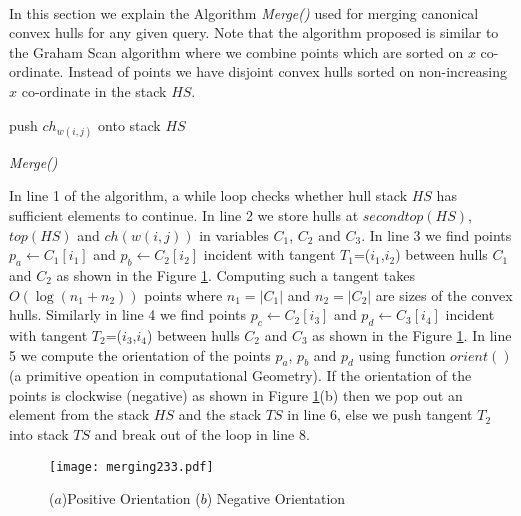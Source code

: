 \documentclass[runningheads,a4paper]{llncs}
\begin{document}
\paragraph{}
In this section we explain the Algorithm \emph{Merge()} used for merging canonical
convex hulls for any given query.  Note that the algorithm proposed is similar
to the Graham Scan algorithm \cite{graham} where we combine points which are
sorted on $x$ co-ordinate.
Instead of points we have disjoint convex hulls sorted on non-increasing $x$ co-ordinate in the stack $HS$.
\begin{algorithm}\label{merging}
push $ch_{w(i,j)}$ onto stack $HS$\;
\caption{\em Merge()}
\end{algorithm}
In line 1 of the algorithm, a while loop checks whether hull stack $HS$ has
sufficient elements to continue.  In line 2 we store hulls at $secondtop(HS)$,
$top(HS)$ and $ch(w(i,j))$ in variables $C_{1}$, $C_{2}$ and $C_{3}$.  In line
3 we find points $p_{a}\leftarrow C_{1}[i_{1}]$ and $p_{b}\leftarrow
C_{2}[i_{2}]$ incident with tangent $T_{1}$=($i_{1}$,$i_{2}$) between hulls
$C_{1}$ and $C_{2}$ as shown in the Figure \ref{fig4}.  Computing such a tangent takes $O(\log(n_{1}+n_{2}))$
points where $n_{1}=|C_{1}|$ and $n_{2}=|C_{2}|$ are sizes of the convex
hulls.  Similarly in line 4 we find points $p_{c}\leftarrow C_{2}[i_{3}]$ and
$p_{d}\leftarrow C_{3}[i_{4}]$ incident with tangent $T_{2}$=($i_{3}$,$i_{4}$)
between hulls $C_{2}$ and $C_{3}$ as shown in the Figure \ref{fig4}.  In line 5 we compute the orientation of
the points $p_{a}$, $p_{b}$ and $p_{d}$ using function $orient()$(a primitive opeation in computational Geometry). If the orientation of the points is
clockwise (negative) as shown in Figure \ref{fig4}(b) then we pop out an element from the stack $HS$ and
the stack $TS$ in line 6, else we push tangent $T_{2}$ into stack $TS$ and break out of the loop in line 8.
\begin{figure}
\vspace{-0.5cm}
\centering
\texttt{[image: merging233.pdf]}
\caption{($a$)Positive Orientation ($b$) Negative Orientation}
\label{fig4}
\vspace{-0.7cm}
\end{figure}
\end{document}

